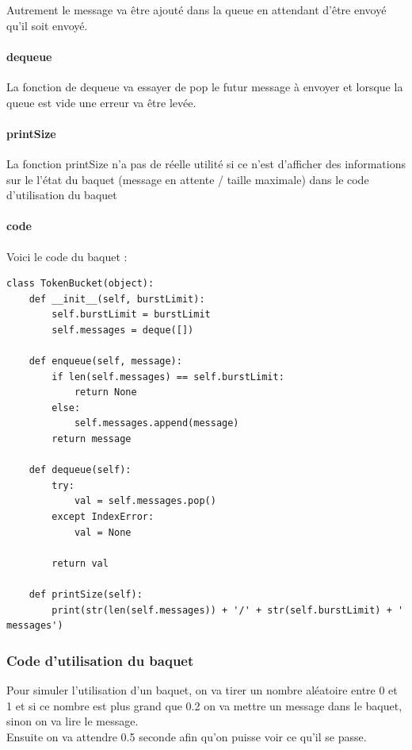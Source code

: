 \documentclass{article}
\begin{document}
Autrement le message va être ajouté dans la queue en attendant d'être envoyé qu'il soit envoyé.

\paragraph{dequeue}

La fonction de dequeue va essayer de pop le futur message à envoyer et lorsque la queue est vide une erreur va être levée.

\paragraph{printSize}

La fonction printSize n'a pas de réelle utilité si ce n'est d'afficher des informations sur le l'état du baquet (message en attente / taille maximale) dans le code d'utilisation du baquet

\paragraph{code}

Voici le code du baquet : 

\begin{lstlisting}
class TokenBucket(object):
	def __init__(self, burstLimit):
		self.burstLimit = burstLimit
		self.messages = deque([])
	
	def enqueue(self, message):
		if len(self.messages) == self.burstLimit:
			return None
		else:
			self.messages.append(message)
		return message
	
	def dequeue(self):
		try:
			val = self.messages.pop()
		except IndexError:
			val = None
		
		return val
	
	def printSize(self):
		print(str(len(self.messages)) + '/' + str(self.burstLimit) + ' messages')
\end{lstlisting}

\subsubsection{Code d'utilisation du baquet}

Pour simuler l'utilisation d'un baquet, on va tirer un nombre aléatoire entre 0 et 1 et si ce nombre est plus grand que 0.2 on va mettre un message dans le baquet, sinon on va lire le message.\\

Ensuite on va attendre 0.5 seconde afin qu'on puisse voir ce qu'il se passe.
\end{document}
